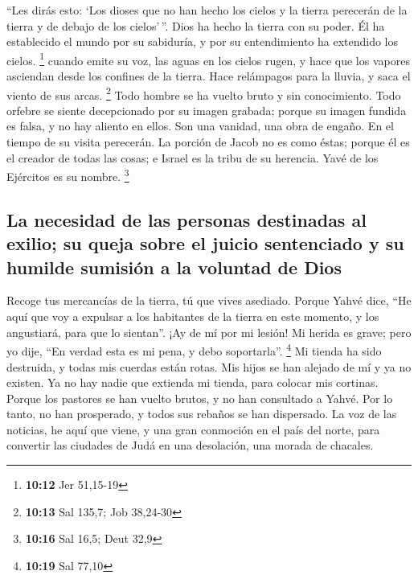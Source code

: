 \begin{paracol}{2}
 ``Les dirás esto: `Los dioses que no han hecho los
cielos y la tierra perecerán de la tierra y de debajo de los
cielos'\,''.  Dios ha hecho la tierra con su poder. Él ha
establecido el mundo por su sabiduría, y por su entendimiento ha
extendido los cielos. \footnote{\textbf{10:12} Jer 51,15-19}
 cuando emite su voz, las aguas en los cielos rugen, y
hace que los vapores asciendan desde los confines de la tierra. Hace
relámpagos para la lluvia, y saca el viento de sus arcas. \footnote{\textbf{10:13}
  Sal 135,7; Job 38,24-30}  Todo hombre se ha vuelto
bruto y sin conocimiento. Todo orfebre se siente decepcionado por su
imagen grabada; porque su imagen fundida es falsa, y no hay aliento en
ellos.  Son una vanidad, una obra de engaño. En el tiempo
de su visita perecerán.  La porción de Jacob no es como
éstas; porque él es el creador de todas las cosas; e Israel es la tribu
de su herencia. Yavé de los Ejércitos es su nombre. \footnote{\textbf{10:16}
  Sal 16,5; Deut 32,9}

\hypertarget{la-necesidad-de-las-personas-destinadas-al-exilio-su-queja-sobre-el-juicio-sentenciado-y-su-humilde-sumisiuxf3n-a-la-voluntad-de-dios}{%
\subsection{La necesidad de las personas destinadas al exilio; su queja
sobre el juicio sentenciado y su humilde sumisión a la voluntad de
Dios}\label{la-necesidad-de-las-personas-destinadas-al-exilio-su-queja-sobre-el-juicio-sentenciado-y-su-humilde-sumisiuxf3n-a-la-voluntad-de-dios}}

 Recoge tus mercancías de la tierra, tú que vives
asediado.  Porque Yahvé dice, ``He aquí que voy a
expulsar a los habitantes de la tierra en este momento, y los
angustiará, para que lo sientan''.  ¡Ay de mí por mi
lesión! Mi herida es grave; pero yo dije, ``En verdad esta es mi pena, y
debo soportarla''. \footnote{\textbf{10:19} Sal 77,10} 
Mi tienda ha sido destruida, y todas mis cuerdas están rotas. Mis hijos
se han alejado de mí y ya no existen. Ya no hay nadie que extienda mi
tienda, para colocar mis cortinas.  Porque los pastores
se han vuelto brutos, y no han consultado a Yahvé. Por lo tanto, no han
prosperado, y todos sus rebaños se han dispersado.  La
voz de las noticias, he aquí que viene, y una gran conmoción en el país
del norte, para convertir las ciudades de Judá en una desolación, una
morada de chacales.


\end{paracol}
